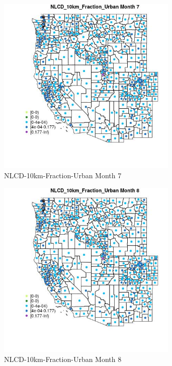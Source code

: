 \begin{figure} 
\centering  
\includegraphics[width=0.77\textwidth]{Code_Outputs/df_report_ML_predictors_CountyCentroid_Locations_Dates_2008-01-01to2018-12-31_MapObsMo7NLCD_10km_Fraction_Urban.jpg} 
\caption{\label{fig:df_report_ML_predictors_CountyCentroid_Locations_Dates_2008-01-01to2018-12-31MapObsMo7NLCD_10km_Fraction_Urban}NLCD-10km-Fraction-Urban Month 7} 
\end{figure} 
 

\begin{figure} 
\centering  
\includegraphics[width=0.77\textwidth]{Code_Outputs/df_report_ML_predictors_CountyCentroid_Locations_Dates_2008-01-01to2018-12-31_MapObsMo8NLCD_10km_Fraction_Urban.jpg} 
\caption{\label{fig:df_report_ML_predictors_CountyCentroid_Locations_Dates_2008-01-01to2018-12-31MapObsMo8NLCD_10km_Fraction_Urban}NLCD-10km-Fraction-Urban Month 8} 
\end{figure} 
 

